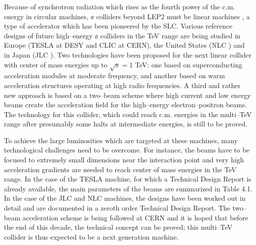 Because of synchrotron radiation which rises as the fourth power of the c.m. 
energy in circular machines, $\ee$ colliders beyond LEP2 must be linear
machines \cite{Technology-choice}, a type of accelerator which has been
pioneered by the SLC.  Various reference designs of future high--energy $\ee$
colliders in the TeV range are being studied in Europe (TESLA \cite{TESLAtdr}
at DESY and CLIC \cite{CLICtdr} at CERN), the United States (NLC \cite{NLCtdr})
and in Japan (JLC \cite{JLCtdr}). Two technologies have been proposed for the
next linear collider with center of mass energies up to $\sqrt{s}=1$ TeV: one
based on superconducting acceleration modules at moderate frequency, and
another based on  warm acceleration structures operating at high radio
frequencies.  A third and rather new approach is based on a two--beam scheme
where high current and low energy beams create the acceleration field for the
high--energy electron--positron beams. The technology for this collider, which
could reach c.m. energies in the multi--TeV range after presumably some halts
at intermediate energies, is still to be proved. \s

To achieve the  large luminosities which are targeted at  these machines, many
technological challenges need to be overcome. For instance, the beams have to
be focused to extremely small dimensions near the interaction point and very
high  acceleration gradients are needed to reach center of mass energies in the
TeV range. In the case of the TESLA machine, for which a Technical Design
Report  is already available, the main parameters of the beams  are summarized
in Table 4.1. In the case of the JLC and NLC machines, the designs have been
worked out in detail and are documented in a zeroth order  Technical Design
Report. The two--beam acceleration scheme is being followed at CERN and it is
hoped that before the end of this decade, the technical concept can be proved; 
this multi--TeV collider is thus expected to be a next generation machine. \s

